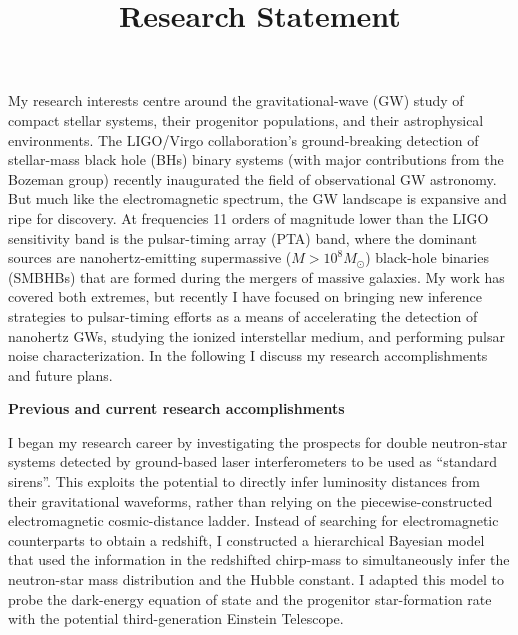 \documentclass[11pt,letterpaper,sans]{moderncv} %
\title{\huge{Research Statement}}
\begin{document}
\makecvtitle %
\vspace{-8mm}

My research interests centre around the gravitational-wave (GW) study of compact stellar systems, their progenitor populations, and their astrophysical environments. The LIGO/Virgo collaboration's ground-breaking detection of stellar-mass black hole (BHs) binary systems (with major contributions from the Bozeman group) recently inaugurated the field of observational GW astronomy. But much like the electromagnetic spectrum, the GW landscape is expansive and ripe for discovery. At frequencies 11 orders of magnitude lower than the LIGO sensitivity band is the pulsar-timing array (PTA) band, where the dominant sources are nanohertz-emitting supermassive ($M > 10^8M_\odot$) black-hole binaries (SMBHBs) that are formed during the mergers of massive galaxies. My work has covered both extremes, but recently I have focused on bringing new inference strategies to pulsar-timing efforts as a means of accelerating the detection of nanohertz GWs, studying the ionized interstellar medium, and performing pulsar noise characterization. In the following I discuss my research accomplishments and future plans.
\vspace{1.5mm}

\textbf{Previous and current research accomplishments}
\vspace{1.5mm}

I began my research career by investigating the prospects for double neutron-star systems detected by ground-based laser interferometers to be used as ``standard sirens''. This exploits the potential to directly infer luminosity distances from their gravitational waveforms, rather than relying on the piecewise-constructed electromagnetic cosmic-distance ladder. Instead of searching for electromagnetic counterparts to obtain a redshift, I constructed a hierarchical Bayesian model that used the information in the redshifted chirp-mass to simultaneously infer the neutron-star mass distribution and the Hubble constant. %
I adapted this model to probe the dark-energy equation of state and the progenitor star-formation rate with the potential third-generation Einstein Telescope.
\vspace{1.5mm}
\end{document}
